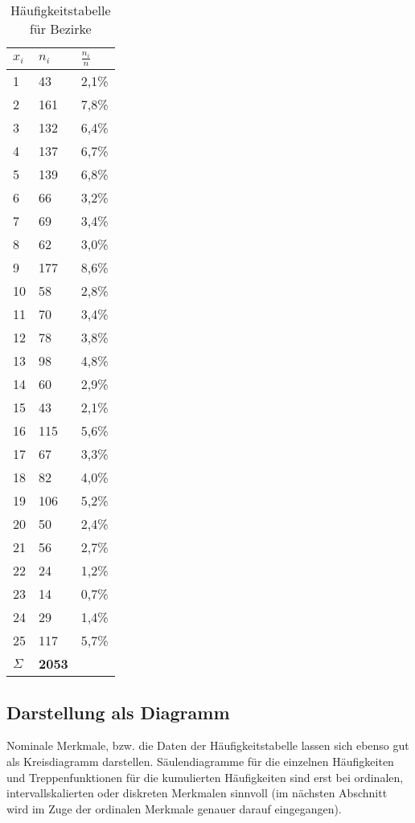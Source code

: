 \begin{table}[h]
\caption{Häufigkeitstabelle für Bezirke}\label{tab:haeufigkeitenBez}
\begin{center}
\begin{tabular}{p{1.25cm}p{1.25cm}p{1.25cm}}
\hline \hline
\textbf{$x_i$} & \textbf{$n_i$} & \textbf{$\frac{n_i}{n}$}\\ 
\hline
1	&	43	&	2,1\% \\
2	&	161	&	7,8\% \\
3	&	132	&	6,4\% \\
4	&	137	&	6,7\% \\
5	&	139	&	6,8\% \\
6	&	66	&	3,2\% \\
7	&	69	&	3,4\% \\
8	&	62	&	3,0\% \\
9	&	177	&	8,6\% \\
10	&	58	&	2,8\% \\
11	&	70	&	3,4\% \\
12	&	78	&	3,8\% \\
13	&	98	&	4,8\% \\
14	&	60	&	2,9\% \\
15	&	43	&	2,1\% \\
16	&	115	&	5,6\% \\
17	&	67	&	3,3\% \\
18	&	82	&	4,0\% \\
19	&	106	&	5,2\% \\
20	&	50	&	2,4\% \\
21	&	56	&	2,7\% \\
22	&	24	&	1,2\% \\
23	&	14	&	0,7\% \\
24	&	29	&	1,4\% \\
25	&	117	&	5,7\% \\
\hline
$\Sigma$ & \textbf{2053}
\end{tabular}
\end{center}
\label{default}
\end{table}%


\subsection{Darstellung als Diagramm}
Nominale Merkmale, bzw. die Daten der Häufigkeitstabelle lassen sich ebenso gut als Kreisdiagramm
darstellen. Säulendiagramme für die einzelnen Häufigkeiten und Treppenfunktionen für die kumulierten
Häufigkeiten sind erst bei ordinalen, intervallskalierten oder diskreten Merkmalen sinnvoll (im
nächsten Abschnitt wird im Zuge der ordinalen Merkmale genauer darauf eingegangen).

